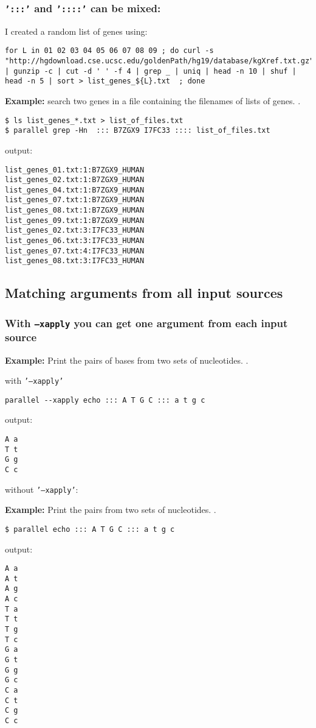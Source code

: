 \documentclass{article}
\newcommand{\example}[1]{
\textbf{Example: } {\color[rgb]{0,0,1} #1 } .
}
\newcommand{\cmdoption}[1]{\texttt{'#1'}}
\begin{document}
\subsubsection{\cmdoption{:::} and \cmdoption{::::} can be mixed:}
I created a random list of genes using:
\begin{lstlisting}
for L in 01 02 03 04 05 06 07 08 09 ; do curl -s "http://hgdownload.cse.ucsc.edu/goldenPath/hg19/database/kgXref.txt.gz" | gunzip -c | cut -d '	' -f 4 | grep _ | uniq | head -n 10 | shuf | head -n 5 | sort > list_genes_${L}.txt  ; done
\end{lstlisting}


\example{search two genes in a file containing the filenames of lists of genes.}
\begin{lstlisting}
$ ls list_genes_*.txt > list_of_files.txt
$ parallel grep -Hn  ::: B7ZGX9 I7FC33 :::: list_of_files.txt
\end{lstlisting}
output:
\begin{lstlisting}
list_genes_01.txt:1:B7ZGX9_HUMAN
list_genes_02.txt:1:B7ZGX9_HUMAN
list_genes_04.txt:1:B7ZGX9_HUMAN
list_genes_07.txt:1:B7ZGX9_HUMAN
list_genes_08.txt:1:B7ZGX9_HUMAN
list_genes_09.txt:1:B7ZGX9_HUMAN
list_genes_02.txt:3:I7FC33_HUMAN
list_genes_06.txt:3:I7FC33_HUMAN
list_genes_07.txt:4:I7FC33_HUMAN
list_genes_08.txt:3:I7FC33_HUMAN
\end{lstlisting}

\subsection{Matching arguments from all input sources}
\subsubsection{With \texttt{--xapply} you can get one argument from each input source}
\example{Print the pairs of bases from two sets of nucleotides. }
with \cmdoption{--xapply}
\begin{lstlisting}
parallel --xapply echo ::: A T G C ::: a t g c
\end{lstlisting}
output:
\begin{lstlisting}
A a
T t
G g
C c
\end{lstlisting}

without \cmdoption{--xapply}:
\example{Print the pairs from two sets of nucleotides. }
\begin{lstlisting}
$ parallel echo ::: A T G C ::: a t g c
\end{lstlisting}
output:
\begin{lstlisting}
A a
A t
A g
A c
T a
T t
T g
T c
G a
G t
G g
G c
C a
C t
C g
C c
\end{lstlisting}
\end{document}
